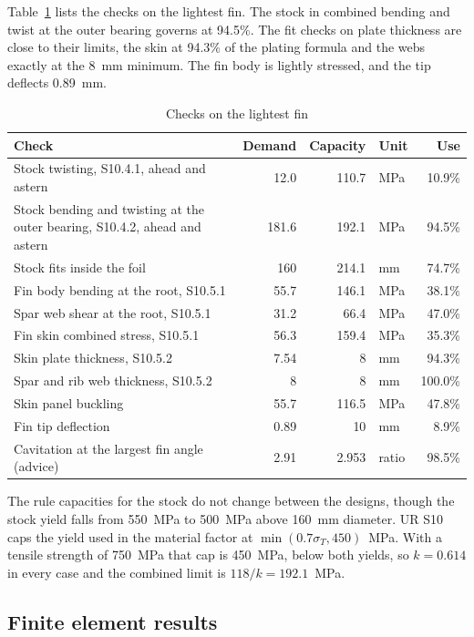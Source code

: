Table~\ref{tab:fin-checks-result} lists the checks on the lightest fin. The
stock in combined bending and twist at the outer bearing governs at 94.5\%.
The fit checks on plate thickness are close to their limits, the skin at
94.3\% of the plating formula and the webs exactly at the 8~mm minimum. The
fin body is lightly stressed, and the tip deflects 0.89~mm.

\begin{table}[H]
\centering
\caption{Checks on the lightest fin}
\label{tab:fin-checks-result}
\small
\begin{tabularx}{\textwidth}{>{\raggedright\arraybackslash}Xrrlr}
\toprule
\textbf{Check} & \textbf{Demand} & \textbf{Capacity} & \textbf{Unit} & \textbf{Use}\\
\midrule
Stock twisting, S10.4.1, ahead and astern & 12.0 & 110.7 & MPa & 10.9\%\\
Stock bending and twisting at the outer bearing, S10.4.2, ahead and astern & 181.6 & 192.1 & MPa & 94.5\%\\
Stock fits inside the foil & 160 & 214.1 & mm & 74.7\%\\
Fin body bending at the root, S10.5.1 & 55.7 & 146.1 & MPa & 38.1\%\\
Spar web shear at the root, S10.5.1 & 31.2 & 66.4 & MPa & 47.0\%\\
Fin skin combined stress, S10.5.1 & 56.3 & 159.4 & MPa & 35.3\%\\
Skin plate thickness, S10.5.2 & 7.54 & 8 & mm & 94.3\%\\
Spar and rib web thickness, S10.5.2 & 8 & 8 & mm & 100.0\%\\
Skin panel buckling & 55.7 & 116.5 & MPa & 47.8\%\\
Fin tip deflection & 0.89 & 10 & mm & 8.9\%\\
Cavitation at the largest fin angle (advice) & 2.91 & 2.953 & ratio & 98.5\%\\
\bottomrule
\end{tabularx}
\end{table}

The rule capacities for the stock do not change between the designs, though
the stock yield falls from 550~MPa to 500~MPa above 160~mm diameter. UR S10
caps the yield used in the material factor at $\min(0.7\sigma_T, 450)$~MPa.
With a tensile strength of 750~MPa that cap is 450~MPa, below both yields, so
$k = 0.614$ in every case and the combined limit is $118/k = 192.1$~MPa.

\subsection{Finite element results}

